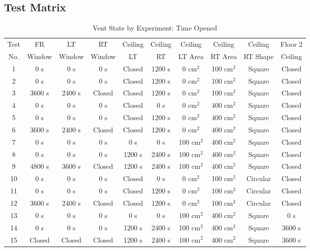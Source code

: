 \subsection{Test Matrix}
\begin{table}[h!]
\caption{Vent State by Experiment: Time Opened}
\begin{center}
\begin{tabular}{|c|c|c|c|c|c|c|c|c|c|}
\hline
Test&FR    &LT    &RT    &Ceiling&Ceiling&Ceiling&Ceiling&Ceiling&Floor 2\\
No. &Window&Window&Window&LT     &RT     &LT Area&RT Area&RT Shape&Ceiling\\ \hline \hline
1   &  0 s     &  0 s     &  0 s     &  Closed    &  1200 s    &  0 cm$^2$     &  100 cm$^2$  &  Square& Closed \\ \hline
2   &  0 s     &  0 s     &  0 s     &  Closed    &  1200 s    &  0 cm$^2$     &  100 cm$^2$  &  Square& Closed \\ \hline
3   &  3600 s     &  2400 s     &  Closed     &  Closed     &  1200 s    &  0 cm$^2$     &  100 cm$^2$  &  Square & Closed\\ \hline
4   &  0 s     &  0 s     &  0 s     &  Closed     &  0 s    &  0 cm$^2$     & 400 cm$^2$  &  Square & Closed \\ \hline
5   &  0 s     &  0 s     &  0 s     &  Closed     &  1200 s    &  0 cm$^2$     &  400 cm$^2$  &  Square & Closed \\ \hline
6   &  3600 s     &  2400 s     &  Closed     &  Closed     &  1200 s    &  0 cm$^2$     &  400 cm$^2$  &  Square & Closed\\ \hline
7   &  0 s     &  0 s     &  0 s     &  0 s     &  0 s    &  100 cm$^2$     &  400 cm$^2$  &  Square& Closed \\ \hline
8   &  0 s     &  0 s     &  0 s     &  1200 s     &  2400 s    &  100 cm$^2$     &  400 cm$^2$  &  Square& Closed\\ \hline
9   &  4800 s     &  3600 s     &  Closed     &  1200 s     &  2400 s    &  100 cm$^2$     &  400 cm$^2$  &  Square & Closed\\ \hline
10   &  0 s     &  0 s     &  0 s     &  Closed    &  0 s        &  0 cm$^2$     &  100 cm$^2$  &Circular& Closed\\ \hline
11   &  0 s     &  0 s     &  0 s     &  Closed    &  1200 s    &  0 cm$^2$     &  100 cm$^2$  &Circular& Closed\\ \hline
12   &  3600 s     &  2400 s     &   Closed     &  Closed    &  1200 s    &  0 cm$^2$     &  100 cm$^2$  &Circular& Closed\\ \hline
13   &  0 s     &  0 s     &  0 s     &  0 s     &  0 s    &  100 cm$^2$     &  400 cm$^2$  &  Square& 0 s \\ \hline
14   &  0 s     &  0 s     &  0 s     &  1200 s     &  2400 s    &  100 cm$^2$     &  400 cm$^2$  &  Square& 3600 s \\ \hline 
15   &   Closed     & Closed     &  Closed     &  1200 s     &  2400 s    &  100 cm$^2$     &  400 cm$^2$  &  Square& 3600 s \\ \hline 
\end{tabular}
\end{center}
\label{tab:NIST_Vent_Study}
\end{table}


